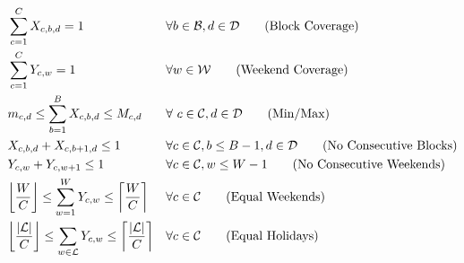 \begin{align}
	&\sum_{c=1}^{C} X_{c, b, d} = 1 &&\forall b\in \mathcal{B}, d \in \mathcal{D} \tag{Block Coverage} \label{eqn:constr-block-cov} \\
	&\sum_{c=1}^{C} Y_{c, w} = 1 &&\forall w\in \mathcal{W} \tag{Weekend Coverage} \label{eqn:constr-weekend-cov} \\
	&m_{c, d} \leq \sum_{b=1}^{B} X_{c, b, d} \leq M_{c, d} &&\forall\ c\in\mathcal{C}, d\in\mathcal{D} \tag{Min/Max} \label{eqn:constr-min-max} \\
	&X_{c, b, d} + X_{c, b + 1, d} \leq 1 &&\forall c\in\mathcal{C}, b \leq B - 1, d\in\mathcal{D} \tag{No Consecutive Blocks} \label{eqn:constr-no-consec-blocks} \\
	&Y_{c, w} + Y_{c, w + 1} \leq 1 &&\forall c\in\mathcal{C}, w \leq W - 1 \tag{No Consecutive Weekends} \label{eqn:constr-no-consec-weekends} \\
	&\floor*{\frac{W}{C}} \leq \sum_{w=1}^W Y_{c, w} \leq \ceil*{\frac{W}{C}} &&\forall c\in\mathcal{C} \tag{Equal Weekends} \label{eqn:constr-equal-weekends} \\
	&\floor*{\frac{\abs{\mathcal{L}}}{C}} \leq \sum_{w\in\mathcal{L}} Y_{c, w} \leq \ceil*{\frac{\abs{\mathcal{L}}}{C}} &&\forall c\in\mathcal{C} \tag{Equal Holidays} \label{eqn:constr-equal-holidays}
\end{align}

